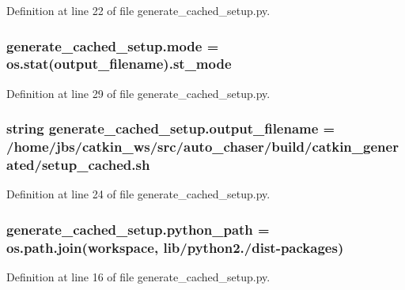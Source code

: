 Definition at line 22 of file generate\+\_\+cached\+\_\+setup.\+py.

\subsubsection[{\texorpdfstring{mode}{mode}}]{\setlength{\rightskip}{0pt plus 5cm}generate\+\_\+cached\+\_\+setup.\+mode = os.\+stat({\bf output\+\_\+filename}).st\+\_\+mode}\hypertarget{namespacegenerate__cached__setup_a10081e5abedae9bd46dd91202096e789}{}\label{namespacegenerate__cached__setup_a10081e5abedae9bd46dd91202096e789}


Definition at line 29 of file generate\+\_\+cached\+\_\+setup.\+py.

\subsubsection[{\texorpdfstring{output\+\_\+filename}{output_filename}}]{\setlength{\rightskip}{0pt plus 5cm}string generate\+\_\+cached\+\_\+setup.\+output\+\_\+filename = \textquotesingle{}/home/jbs/catkin\+\_\+ws/src/auto\+\_\+chaser/build/catkin\+\_\+generated/setup\+\_\+cached.\+sh\textquotesingle{}}\hypertarget{namespacegenerate__cached__setup_a0265aee5075ee1eb701ff69c98ad6793}{}\label{namespacegenerate__cached__setup_a0265aee5075ee1eb701ff69c98ad6793}


Definition at line 24 of file generate\+\_\+cached\+\_\+setup.\+py.

\subsubsection[{\texorpdfstring{python\+\_\+path}{python_path}}]{\setlength{\rightskip}{0pt plus 5cm}generate\+\_\+cached\+\_\+setup.\+python\+\_\+path = os.\+path.\+join(workspace, \textquotesingle{}lib/python2./dist-\/packages\textquotesingle{})}\hypertarget{namespacegenerate__cached__setup_a72579fd01529a79bab20d99291889d3f}{}\label{namespacegenerate__cached__setup_a72579fd01529a79bab20d99291889d3f}


Definition at line 16 of file generate\+\_\+cached\+\_\+setup.\+py.

